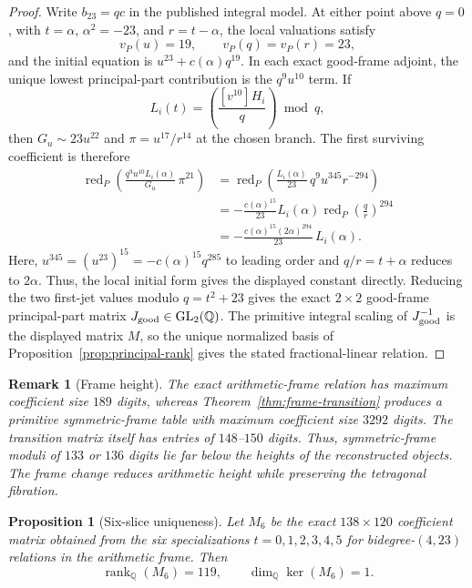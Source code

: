 \documentclass[11pt]{article}
\newtheorem{proposition}[theorem]{Proposition}
\newtheorem{remark}[theorem]{Remark}
\newcommand{\Q}{\mathbb Q}
\begin{document}
\begin{proof}
Write $b_{23}=qc$ in the published integral model.  At either point above $q=0$, with $t=\alpha$, $\alpha^2=-23$, and $r=t-\alpha$, the local valuations satisfy
\[
 v_P(u)=19,\qquad v_P(q)=v_P(r)=23,
\]
and the initial equation is $u^{23}+c(\alpha)q^{19}$.  In each exact good-frame adjoint, the unique lowest principal-part contribution is the $q^9u^{10}$ term.  If
\[
 L_i(t)=\left(\frac{[v^{10}]H_i}{q}\right)\bmod q,
\]
then $G_u\sim23u^{22}$ and $\pi=u^{17}/r^{14}$ at the chosen branch.  The first surviving coefficient is therefore
\[
\begin{aligned}
\operatorname{red}_P\!\left(
 \frac{q^9u^{10}L_i(\alpha)}{G_u}\,\pi^{21}\right)
&=\operatorname{red}_P\!\left(
 \frac{L_i(\alpha)}{23}\,q^9u^{345}r^{-294}\right)\\
&=-\frac{c(\alpha)^{15}}{23}L_i(\alpha)
  \operatorname{red}_P\!\left(\frac{q}{r}\right)^{294}\\
&=-\frac{c(\alpha)^{15}(2\alpha)^{294}}{23}\,L_i(\alpha).
\end{aligned}
\]
Here, $u^{345}=(u^{23})^{15}=-c(\alpha)^{15}q^{285}$ to leading order and $q/r=t+\alpha$ reduces to $2\alpha$.  Thus, the local initial form gives the displayed constant directly.
Reducing the two first-jet values modulo $q=t^2+23$ gives the exact $2\times2$ good-frame principal-part matrix $J_{\rm good}\in\mathrm{GL}_2(\Q)$.  The primitive integral scaling of $J_{\rm good}^{-1}$ is the displayed matrix $M$, so the unique normalized basis of Proposition~\ref{prop:principal-rank} gives the stated fractional-linear relation.

\end{proof}

\begin{remark}[Frame height]
The exact arithmetic-frame relation has maximum coefficient size $189$ digits, whereas Theorem~\ref{thm:frame-transition} produces a primitive symmetric-frame table with maximum coefficient size $3292$ digits.  The transition matrix itself has entries of $148$--$150$ digits.  Thus, symmetric-frame moduli of $133$ or $136$ digits lie far below the heights of the reconstructed objects.  The frame change reduces arithmetic height while preserving the tetragonal fibration.
\end{remark}



\begin{proposition}[Six-slice uniqueness]\label{prop:six-slice-unique}
Let $M_6$ be the exact $138\times120$ coefficient matrix obtained from the six specializations $t=0,1,2,3,4,5$ for bidegree-$(4,23)$ relations in the arithmetic frame.  Then
\[
\operatorname{rank}_{\Q}(M_6)=119,
\qquad
\dim_{\Q}\ker(M_6)=1.
\]
\end{proposition}
\end{document}
